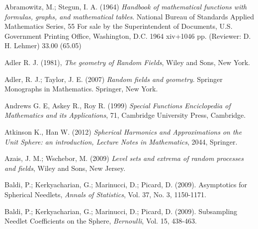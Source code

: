 	\begin{thebibliography}{99}
	
	 Abramowitz, M.; Stegun, I. A. (1964) \textit{Handbook of mathematical functions with formulas, graphs, and mathematical tables}. National Bureau of Standards Applied Mathematics Series, 55 For sale by the Superintendent of Documents, U.S. Government Printing Office, Washington, D.C. 1964 xiv+1046 pp. (Reviewer: D. H. Lehmer) 33.00 (65.05)
	
	 Adler R. J. (1981), \textit{The geometry of Random Fields}, Wiley and Sons, New York. 
	
	 Adler, R. J.; Taylor, J. E. (2007)
	\textit{Random fields and geometry}. Springer Monographs in Mathematics. Springer,
	New York.
	
	 Andrews G. E, Askey R., Roy R. (1999) \textit{Special Functions Enciclopedia of Mathematics and its Applications}, 71, Cambridge University Press, Cambridge.
	
	 Atkinson K., Han W. (2012) \textit{Spherical Harmonics and Approximations on the Unit Sphere: an introduction, Lecture Notes in Mathematics}, 2044, Springer.
	
	
	
	
	 Azais, J. M.; Wschebor, M. (2009) \textit{Level sets
		and extrema of random processes and fields}, Wiley and Sons, New Jersey.
	
	
	
	 Baldi, P.; Kerkyacharian, G.; Marinucci, D.; Picard, D. (2009). Asymptotics for Spherical Needlets, \textit{Annals of Statistics}, Vol. 37, No. 3, 1150-1171.
	
	 Baldi, P.; Kerkyacharian, G.; Marinucci, D.; Picard, D. (2009). Subsampling Needlet Coefficients on the Sphere, \textit{Bernoulli}, Vol. 15, 438-463.
	

\end{thebibliography}
